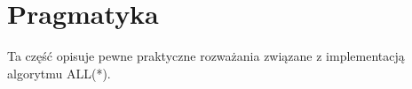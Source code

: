 \section{Pragmatyka}
Ta część opisuje pewne praktyczne rozważania
związane z implementacją algorytmu ALL(*).
